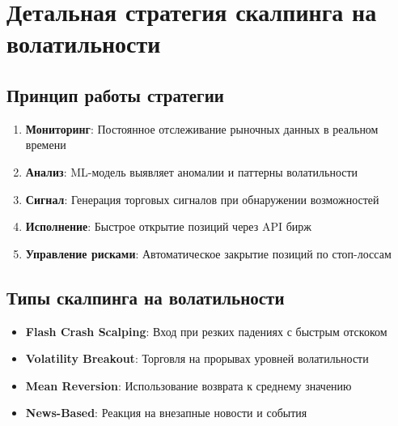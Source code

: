 \documentclass[12pt,a4paper]{article}
\begin{document}
\section{Детальная стратегия скалпинга на волатильности}

\subsection{Принцип работы стратегии}
\begin{enumerate}
    \item \textbf{Мониторинг}: Постоянное отслеживание рыночных данных в реальном времени
    \item \textbf{Анализ}: ML-модель выявляет аномалии и паттерны волатильности
    \item \textbf{Сигнал}: Генерация торговых сигналов при обнаружении возможностей
    \item \textbf{Исполнение}: Быстрое открытие позиций через API бирж
    \item \textbf{Управление рисками}: Автоматическое закрытие позиций по стоп-лоссам
\end{enumerate}

\subsection{Типы скалпинга на волатильности}
\begin{itemize}
    \item \textbf{Flash Crash Scalping}: Вход при резких падениях с быстрым отскоком
    \item \textbf{Volatility Breakout}: Торговля на прорывах уровней волатильности
    \item \textbf{Mean Reversion}: Использование возврата к среднему значению
    \item \textbf{News-Based}: Реакция на внезапные новости и события
\end{itemize}
\end{document}
